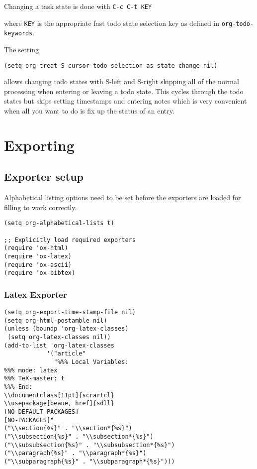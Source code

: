 \documentclass[11pt]{scrartcl}
\begin{document}
Changing a task state is done with \texttt{C-c C-t KEY}

where \texttt{KEY} is the appropriate fast todo state selection key as defined in \texttt{org-todo-keywords}.

The setting
\begin{verbatim}
(setq org-treat-S-cursor-todo-selection-as-state-change nil)
\end{verbatim}
allows changing todo states with S-left and S-right skipping all of
the normal processing when entering or leaving a todo state.  This
cycles through the todo states but skips setting timestamps and
entering notes which is very convenient when all you want to do is fix
up the status of an entry.
\section{Exporting}
\label{sec:orgheadline38}

\subsection{Exporter setup}
\label{sec:orgheadline36}

Alphabetical listing options need to be set before the exporters are
loaded for filling to work correctly.

\begin{verbatim}
(setq org-alphabetical-lists t)

;; Explicitly load required exporters
(require 'ox-html)
(require 'ox-latex)
(require 'ox-ascii)
(require 'ox-bibtex)
\end{verbatim}

\subsubsection{Latex Exporter}
\label{sec:orgheadline35}
\begin{verbatim}
(setq org-export-time-stamp-file nil)
(setq org-html-postamble nil)
(unless (boundp 'org-latex-classes)
 (setq org-latex-classes nil))
(add-to-list 'org-latex-classes
            '("article"
              "%%% Local Variables:
%%% mode: latex
%%% TeX-master: t
%%% End:
\\documentclass[11pt]{scrartcl}
\\usepackage[beaue, href]{sdll}
[NO-DEFAULT-PACKAGES]
[NO-PACKAGES]"
("\\section{%s}" . "\\section*{%s}")
("\\subsection{%s}" . "\\subsection*{%s}")
("\\subsubsection{%s}" . "\\subsubsection*{%s}")
("\\paragraph{%s}" . "\\paragraph*{%s}")
("\\subparagraph{%s}" . "\\subparagraph*{%s}")))
\end{verbatim}
\end{document}
